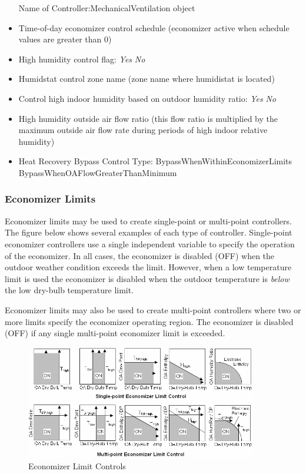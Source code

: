 \begin{itemize}
  Name of Controller:MechanicalVentilation object
\item
  Time-of-day economizer control schedule (economizer active when schedule values are greater than 0)
\item
  High humidity control flag: \emph{Yes} \textbar{} \emph{No}
\item
  Humidstat control zone name (zone name where humidistat is located)
\item
  Control high indoor humidity based on outdoor humidity ratio: \emph{Yes} \textbar{} \emph{No}
\item
  High humidity outside air flow ratio (this flow ratio is multiplied by the maximum outside air flow rate during periods of high indoor relative humidity)
\item
  Heat Recovery Bypass Control Type: BypassWhenWithinEconomizerLimits \textbar{} BypassWhenOAFlowGreaterThanMinimum
\end{itemize}

\subsubsection{Economizer Limits}\label{economizer-limits}

Economizer limits may be used to create single-point or multi-point controllers. The figure below shows several examples of each type of controller. Single-point economizer controllers use a single independent variable to specify the operation of the economizer. In all cases, the economizer is disabled (OFF) when the outdoor weather condition exceeds the limit. However, when a low temperature limit is used the economizer is disabled when the outdoor temperature is \emph{below} the low dry-bulb temperature limit.

Economizer limits may also be used to create multi-point controllers where two or more limits specify the economizer operating region. The economizer is disabled (OFF) if any single multi-point economizer limit is exceeded.

\begin{figure}[hbtp] %
\centering
\includegraphics[width=0.9\textwidth, height=0.9\textheight, keepaspectratio=true]{media/image4411.png}
\caption{Economizer Limit Controls \protect \label{fig:economizer-limit-controls}}
\end{figure}


